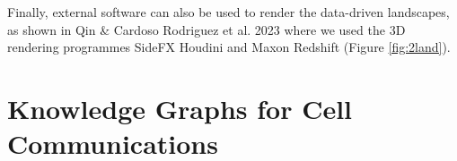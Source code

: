 Finally, external software can also be used to render the data-driven landscapes, as shown in Qin \& Cardoso Rodriguez et al. 2023 where we used the 3D rendering programmes SideFX Houdini and Maxon Redshift (Figure \ref{fig:2land}).






\newpage
\section{Knowledge Graphs for Cell Communications}

